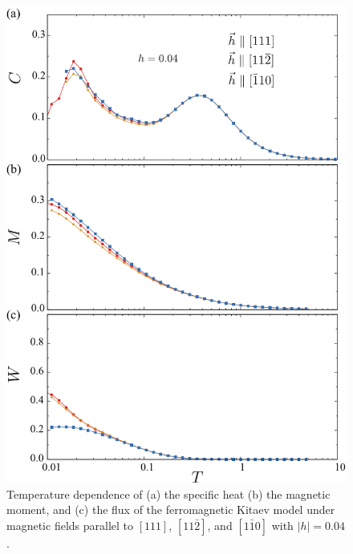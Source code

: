 \documentclass[reprint,amsmath,amssymb,aps,prx]{revtex4-2}
\begin{document}
\begin{figure}
  \begin{center}
    \includegraphics[width=0.9\linewidth]{Figs/plot_CMF_h0.04_ab.pdf}
  \end{center}
  \caption{Temperature dependence of (a) the specific heat (b) the magnetic moment, and (c) the flux of the ferromagnetic Kitaev model under magnetic fields parallel to $[111]$, $[11\bar{2}]$, and $[1\bar{1}0]$ with $|h|=0.04$.}
  \label{fig:CMF_h0.04_ab}
\end{figure}
\end{document}
